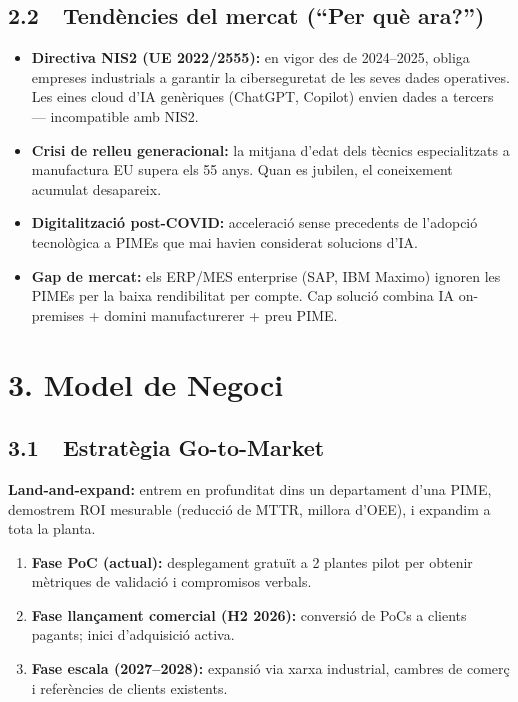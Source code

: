 \documentclass[11pt,a4paper]{article}
\begin{document}
\subsection{2.2~~Tendències del mercat (``Per què ara?'')}

\begin{itemize}[leftmargin=1.5em,itemsep=2pt]
\item \textbf{Directiva NIS2 (UE 2022/2555):} en vigor des de 2024--2025, obliga empreses industrials a garantir la ciberseguretat de les seves dades operatives. Les eines cloud d'IA genèriques (ChatGPT, Copilot) envien dades a tercers --- incompatible amb NIS2.
\item \textbf{Crisi de relleu generacional:} la mitjana d'edat dels tècnics especialitzats a manufactura EU supera els 55 anys. Quan es jubilen, el coneixement acumulat desapareix.
\item \textbf{Digitalització post-COVID:} acceleració sense precedents de l'adopció tecnològica a PIMEs que mai havien considerat solucions d'IA.
\item \textbf{Gap de mercat:} els ERP/MES enterprise (SAP, IBM Maximo) ignoren les PIMEs per la baixa rendibilitat per compte. Cap solució combina IA on-premises + domini manufacturerer + preu PIME.
\end{itemize}

\section{3. Model de Negoci}

\subsection{3.1~~Estratègia Go-to-Market}

\textbf{Land-and-expand:} entrem en profunditat dins un departament d'una PIME, demostrem ROI mesurable (reducció de MTTR, millora d'OEE), i expandim a tota la planta.

\begin{enumerate}[leftmargin=1.5em,itemsep=2pt]
\item \textbf{Fase PoC (actual):} desplegament gratuït a 2 plantes pilot per obtenir mètriques de validació i compromisos verbals.
\item \textbf{Fase llançament comercial (H2 2026):} conversió de PoCs a clients pagants; inici d'adquisició activa.
\item \textbf{Fase escala (2027--2028):} expansió via xarxa industrial, cambres de comerç i referències de clients existents.
\end{enumerate}
\end{document}

